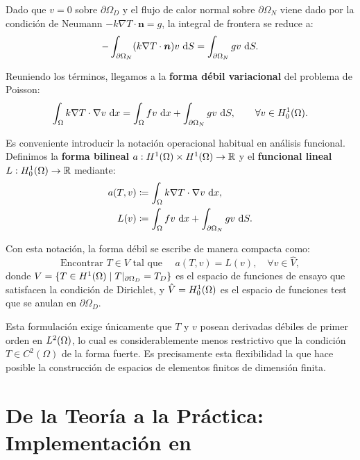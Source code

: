 Dado que $v = 0$ sobre $\partial\Omega_D$ y el flujo de calor normal sobre $\partial\Omega_N$ viene dado por la condici\'on de Neumann $-k \nabla T \cdot \bm{n} = g$, la integral de frontera se reduce a:
\begin{equation}
    -\int_{\partial\Omega_N} (k \nabla T \cdot \bm{n}) v \, \mathop{}\!\mathrm{d} S = \int_{\partial\Omega_N} g v \, \mathop{}\!\mathrm{d} S.
\end{equation}

Reuniendo los t\'erminos, llegamos a la \textbf{forma d\'ebil variacional} del problema de Poisson:
\begin{equation}
    \int_\Omega k \nabla T \cdot \nabla v \, \mathop{}\!\mathrm{d} x = \int_\Omega f v \, \mathop{}\!\mathrm{d} x + \int_{\partial\Omega_N} g v \, \mathop{}\!\mathrm{d} S, \qquad \forall v \in H^1_0(\Omega).
    \label{eq:forma_debil_poisson}
\end{equation}

Es conveniente introducir la notaci\'on operacional habitual en an\'alisis funcional. Definimos la \textbf{forma bilineal} $a: H^1(\Omega) \times H^1(\Omega) \to \mathbb{R}$ y el \textbf{funcional lineal} $L: H^1_0(\Omega) \to \mathbb{R}$ mediante:
\begin{align}
    a(T, v) &\coloneqq \int_\Omega k \nabla T \cdot \nabla v \, \mathop{}\!\mathrm{d} x, \\
    L(v) &\coloneqq \int_\Omega f v \, \mathop{}\!\mathrm{d} x + \int_{\partial\Omega_N} g v \, \mathop{}\!\mathrm{d} S.
\end{align}

Con esta notaci\'on, la forma d\'ebil se escribe de manera compacta como:
\begin{equation}
    \text{Encontrar } T \in V \text{ tal que } \quad a(T, v) = L(v), \quad \forall v \in \hat{V},
\end{equation}
donde $V = \{ T \in H^1(\Omega) \mid T|_{\partial\Omega_D} = T_D \}$ es el espacio de funciones de ensayo que satisfacen la condici\'on de Dirichlet, y $\hat{V} = H^1_0(\Omega)$ es el espacio de funciones test que se anulan en $\partial\Omega_D$.

Esta formulaci\'on exige \'unicamente que $T$ y $v$ posean derivadas d\'ebiles de primer orden en $L^2(\Omega)$, lo cual es considerablemente menos restrictivo que la condici\'on $T \in C^2(\Omega)$ de la forma fuerte. Es precisamente esta flexibilidad la que hace posible la construcci\'on de espacios de elementos finitos de dimensi\'on finita.


\section{De la Teoría a la Práctica: Implementación en \fenics}
\label{sec:poisson-fenics}

